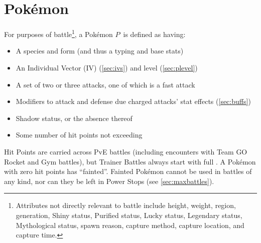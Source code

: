 \chapter{Pokémon\label{chap:pokemon}}
For purposes of battle\footnote{Attributes not directly relevant to battle include height, weight, region,
generation, Shiny status, Purified status, Lucky status, Legendary status, Mythological status, spawn
reason, capture method, capture location, and capture time.}, a Pokémon $P$\, is defined as having:
\begin{itemize}
\item A species and form (and thus a typing and base stats)
\item An Individual Vector (IV) (\autoref{sec:ivs}) and level (\autoref{sec:plevel})
\item A set of two or three attacks, one of which is a fast attack
\item Modifiers to attack and defense due charged attacks' stat effects (\autoref{sec:buffs})
\item Shadow status, or the absence thereof
\item Some number of hit points not exceeding \MHP
\end{itemize}
Hit Points are carried across PvE battles (including encounters with
  Team GO Rocket and Gym battles), but Trainer Battles always start with full \HP\@.
A Pokémon with zero hit points has ``fainted''.
Fainted Pokémon cannot be used in battles of any kind, nor can they be left in
 Power Stops (see \autoref{sec:maxbattles}).

